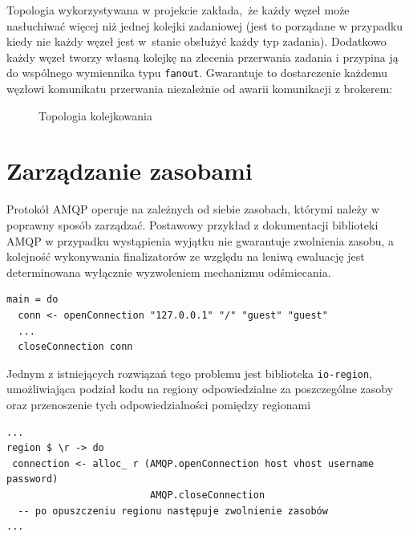 Topologia wykorzystywana w projekcie zakłada, że każdy węzeł może nasłuchiwać więcej niż jednej kolejki zadaniowej (jest to porządane w przypadku kiedy nie każdy węzeł jest w~stanie obsłużyć każdy typ zadania). Dodatkowo każdy węzeł tworzy własną kolejkę na zlecenia przerwania zadania i przypina ją do wspólnego wymiennika typu \lstinline{fanout}. Gwarantuje to dostarczenie każdemu węzłowi komunikatu przerwania niezależnie od awarii komunikacji z brokerem: 

\begin{figure}
\resizebox{\textwidth}{!}{%

}%
\caption{Topologia kolejkowania}
\end{figure}

\section{Zarządzanie zasobami}
Protokół AMQP operuje na zależnych od siebie zasobach, którymi należy w poprawny sposób zarządzać. Postawowy przykład z dokumentacji biblioteki AMQP w przypadku wystąpienia wyjątku nie gwarantuje zwolnienia zasobu, a kolejność wykonywania finalizatorów ze względu na leniwą ewaluację jest determinowana wyłącznie wyzwoleniem mechanizmu odśmiecania.

\begin{lstlisting}[caption=Łączenie z RabbitMQ]
main = do
  conn <- openConnection "127.0.0.1" "/" "guest" "guest"
  ...
  closeConnection conn
\end{lstlisting}

Jednym z istniejących rozwiązań tego problemu jest biblioteka \texttt{io-region}\cite{IoReg}, umożliwiająca podział kodu na regiony odpowiedzialne za poszczególne zasoby oraz przenoszenie tych odpowiedzialności pomiędzy regionami
\newpage
\begin{lstlisting}[caption=Regionalizacja zasobów]
...
region $ \r -> do
 connection <- alloc_ r (AMQP.openConnection host vhost username password)
                         AMQP.closeConnection
  -- po opuszczeniu regionu następuje zwolnienie zasobów
...
\end{lstlisting}

